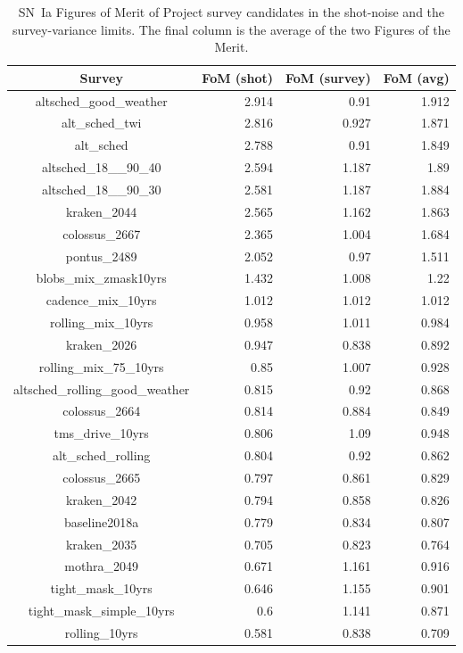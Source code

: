 \documentclass[a4paper,10pt]{article}
\begin{document}
\begin{table}
\caption{SN~Ia Figures of Merit of Project survey candidates
in  the shot-noise and the survey-variance limits.  The final column is the average
of the two Figures of the Merit.\label{table:ref}}
\centering
\begin{tabular}{|c|rrr|}
\hline
Survey & FoM (shot) & FoM (survey) & FoM (avg)\\
\hline
altsched\_good\_weather & 2.914 & 0.91 & 1.912  \\
alt\_sched\_twi & 2.816 & 0.927 & 1.871  \\
alt\_sched & 2.788 & 0.91 & 1.849  \\
altsched\_18\_\_90\_40 & 2.594 & 1.187 & 1.89  \\
altsched\_18\_\_90\_30 & 2.581 & 1.187 & 1.884  \\
kraken\_2044 & 2.565 & 1.162 & 1.863  \\
colossus\_2667 & 2.365 & 1.004 & 1.684  \\
pontus\_2489 & 2.052 & 0.97 & 1.511  \\
blobs\_mix\_zmask10yrs & 1.432 & 1.008 & 1.22  \\
cadence\_mix\_10yrs & 1.012 & 1.012 & 1.012  \\
rolling\_mix\_10yrs & 0.958 & 1.011 & 0.984  \\
kraken\_2026 & 0.947 & 0.838 & 0.892  \\
rolling\_mix\_75\_10yrs & 0.85 & 1.007 & 0.928  \\
altsched\_rolling\_good\_weather & 0.815 & 0.92 & 0.868  \\
colossus\_2664 & 0.814 & 0.884 & 0.849  \\
tms\_drive\_10yrs & 0.806 & 1.09 & 0.948  \\
alt\_sched\_rolling & 0.804 & 0.92 & 0.862  \\
colossus\_2665 & 0.797 & 0.861 & 0.829  \\
kraken\_2042 & 0.794 & 0.858 & 0.826  \\
baseline2018a & 0.779 & 0.834 & 0.807  \\
kraken\_2035 & 0.705 & 0.823 & 0.764  \\
mothra\_2049 & 0.671 & 1.161 & 0.916  \\
tight\_mask\_10yrs & 0.646 & 1.155 & 0.901  \\
tight\_mask\_simple\_10yrs & 0.6 & 1.141 & 0.871  \\
rolling\_10yrs & 0.581 & 0.838 & 0.709  \\

\end{tabular}
\end{table}
\end{document}
